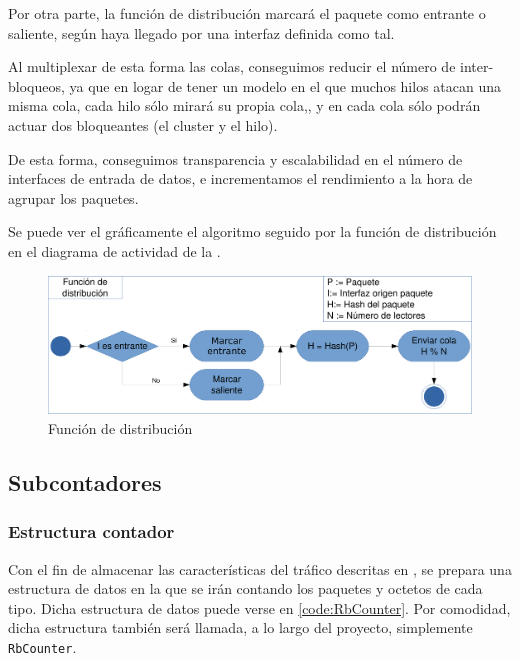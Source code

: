 Por otra parte, la función de distribución marcará el paquete como entrante o saliente, según haya llegado por una 
interfaz definida como tal.

Al multiplexar de esta forma las colas, conseguimos reducir el número de inter-bloqueos, ya que en 
logar de tener un modelo en el que muchos hilos atacan una misma cola, cada hilo sólo mirará su propia cola,, y en cada 
cola sólo podrán actuar dos bloqueantes (el cluster y el hilo).

De esta forma, conseguimos transparencia y escalabilidad en el número de interfaces de entrada de datos, e 
incrementamos el rendimiento a la hora de agrupar los paquetes.

Se puede ver el gráficamente el algoritmo seguido por la función de distribución en el diagrama de actividad de la 
.

\begin{figure}[htbp]
\centering
\includegraphics[width=\textwidth]{CapituloEstructura/Figuras/ActividadFuncionDistribucionCluster-crop}
\caption{Función de distribución}
\end{figure}
%

\subsection{Subcontadores}
\subsubsection{Estructura contador}
Con el fin de almacenar las características del tráfico descritas en , se prepara una 
estructura de datos en la que se irán contando los paquetes y octetos de cada tipo. Dicha estructura de datos puede 
verse en \lstlistingname{} \ref{code:RbCounter}. Por comodidad, dicha estructura también será llamada, a lo largo del 
proyecto, simplemente \texttt{RbCounter}.

